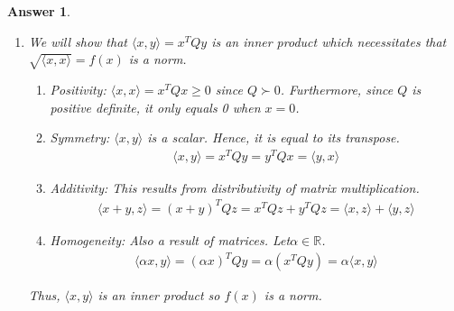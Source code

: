 \documentclass[12pt]{article}
\theoremstyle{colon}
\newtheorem*{answer}{Answer}
\begin{document}
\begin{answer}
  \leavevmode
  \begin{enumerate}[label=\arabic*)]
    \item We will show that $\langle x, y \rangle = x^T Q y$ is an inner product which necessitates that $\sqrt{\langle x,x \rangle} = f(x)$ is a norm.
      \begin{enumerate}[label=\roman*)]
        \item Positivity: $\langle x, x \rangle = x^T Q x \geq 0$ since $Q \succ 0$. Furthermore, since $Q$ is positive definite, it only equals 0 when $x = 0$.

        \item Symmetry: $\langle x, y \rangle$ is a scalar. Hence, it is equal to its transpose.
          \begin{gather*}
            \langle x, y \rangle = x^T Q y = y^T Q x = \langle y, x \rangle
          \end{gather*}

        \item Additivity: This results from distributivity of matrix multiplication.
          \begin{gather*}
            \langle x + y, z \rangle = (x+y)^T Q z = x^T Q z + y^T Q z = \langle x, z \rangle + \langle y, z \rangle
          \end{gather*}

        \item Homogeneity: Also a result of matrices. Let$ \alpha \in \mathbb{R}$.
          \begin{gather*}
            \langle \alpha x, y \rangle = (\alpha x)^T Q y = \alpha(x^T Q y) = \alpha \langle x, y \rangle
          \end{gather*}
      \end{enumerate}
      Thus, $\langle x,y \rangle$ is an inner product so $f(x)$ is a norm.


\end{enumerate}
\end{answer}
\end{document}
